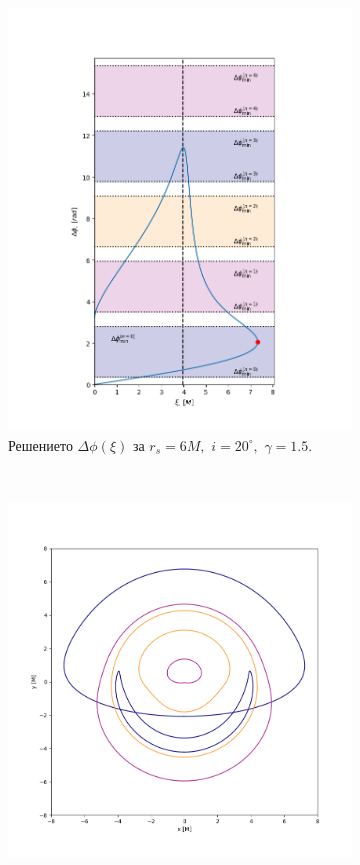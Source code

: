 \begin{figure}[!htb]
	\centering
	\begin{subfigure}{6cm}
		\includegraphics[scale = 0.32]{GB_70_deg_r6_gamma_1.5_impact.png}
		\caption{Решението $\Delta\phi(\xi)$ за $r_s = 6M,\,\, i = 20^\circ,\,\,\gamma = 1.5$.} 
	\end{subfigure}\,\,\,
	\begin{subfigure}{6cm}
		\hspace{-0.8cm}
		\includegraphics[scale = 0.3]{GB_70_deg_r6_gamma_1.5.png}

\end{subfigure}
\end{figure}
